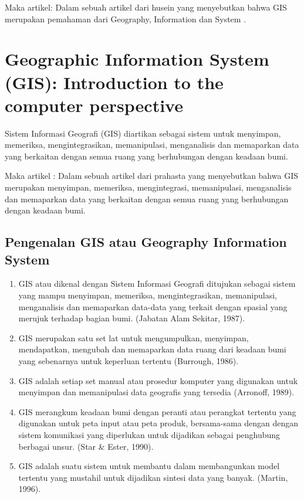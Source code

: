Maka artikel:
	Dalam sebuah artikel dari husein yang menyebutkan bahwa  GIS merupakan pemahaman dari
	Geography, Information dan System \cite{husein2006konsep}.

\section{Geographic Information System (GIS): Introduction to the computer perspective}
Sistem Informasi Geografi (GIS) diartikan sebagai sistem untuk menyimpan, memeriksa, 
mengintegrasikan, memanipulasi, menganalisis dan memaparkan data yang berkaitan dengan semua 
ruang yang berhubungan dengan keadaan bumi.

Maka artikel :
	Dalam sebuah artikel dari prahasta yang menyebutkan bahwa  GIS merupakan menyimpan, memeriksa, mengintegrasi, memanipulasi, menganalisis dan memaparkan data yang berkaitan dengan semua ruang yang berhubungan dengan keadaan bumi\cite{prahasta2009sistem}.

\subsection{Pengenalan GIS atau Geography Information System}
\begin{enumerate}
	
\item GIS atau dikenal dengan Sistem Informasi Geografi ditujukan sebagai sistem yang mampu menyimpan, memeriksa, mengintegrasikan, memanipulasi, menganalisis dan memaparkan data-data yang terkait dengan spasial yang merujuk terhadap bagian bumi. (Jabatan Alam Sekitar, 1987).

\item GIS merupakan satu set lat untuk mengumpulkan, menyimpan, mendapatkan, mengubah dan memaparkan data ruang dari keadaan  bumi yang sebenarnya untuk keperluan tertentu (Burrough, 1986).


\item GIS adalah setiap set manual atau prosedur komputer yang digunakan untuk menyimpan dan memanipulasi data geografis yang tersedia (Arronoff, 1989).


\item GIS merangkum keadaan bumi dengan peranti atau perangkat tertentu yang digunakan untuk peta input atau peta produk, bersama-sama dengan dengan sistem komunikasi yang diperlukan untuk dijadikan sebagai penghubung berbagai unsur. (Star \& Ester, 1990).

\item GIS adalah suatu sistem untuk membantu dalam membangunkan model tertentu yang mustahil untuk dijadikan sintesi data yang banyak. (Martin, 1996).

\end{enumerate}

